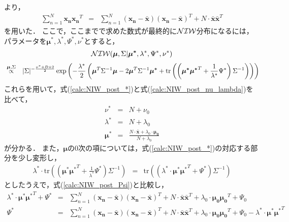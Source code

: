 \documentclass[a4j]{jarticle}
\begin{document}
より，
\begin{eqnarray}
\sum_{n=1}^{N}{\boldsymbol{x_n} \boldsymbol{x_n}^T} &=& \sum_{n=1}^{N}{\left(\boldsymbol{x_n} - \boldsymbol{\bar{x}}\right)\left(\boldsymbol{x_n} - \boldsymbol{\bar{x}}\right)^T} + N \cdot \boldsymbol{\bar{x}} \boldsymbol{\bar{x}}^T
\end{eqnarray}
を用いた．
ここで，ここまでで求めた数式が最終的に$\operatorname{\mathcal{NIW}}$分布になるには，パラメータを$\boldsymbol{\mu^*}, \lambda^*, \Psi^*, \nu^*$とすると，
\begin{eqnarray}
\operatorname{\mathcal{NIW}}(\boldsymbol{\mu}, \Sigma | \boldsymbol{\mu^*}, \lambda^*, \Psi^*, \nu^*) \nonumber
\end{eqnarray}
\begin{eqnarray}
&\overset{\boldsymbol{\mu}, \Sigma}{\propto}&
|\Sigma|^{-\frac{\nu^*+D+2}{2}} \exp{\left( -\frac{\lambda^*}{2} \left( \boldsymbol{\mu}^T \Sigma^{-1}\boldsymbol{\mu} - 2 \boldsymbol{\mu}^T \Sigma^{-1} \boldsymbol{\mu^*} + \textrm{tr}\left(\left( \boldsymbol{\mu^*} \boldsymbol{\mu^*}^T + \frac{1}{\lambda^*} \Psi^* \right) \Sigma^{-1} \right) \right)\right)} \nonumber \\ \label{calc:NIW_post_*}
\end{eqnarray}
これらを用いて，式(\ref{calc:NIW_post_*})と式(\ref{calc:NIW_post_nu_lambda})を比べて，
\begin{eqnarray}
\nu^* &=& N + \nu_0\\
\lambda^* &=& N + \lambda_0\\
\boldsymbol{\mu^*} &=& \frac{N \cdot \boldsymbol{\bar{x}} + \lambda_0  \cdot \boldsymbol{\mu_0}}{N + \lambda_0}
\end{eqnarray}
が分かる．
また，$\boldsymbol{\mu}$の0次の項については，式(\ref{calc:NIW_post_*})の対応する部分を少し変形し，
\begin{eqnarray}
\lambda^* \cdot \textrm{tr}\left(\left(\boldsymbol{\mu^*}\boldsymbol{\mu^*}^T + \frac{1}{\lambda^*} \Psi^*\right)\Sigma^{-1}\right) &=& \textrm{tr}\left(\left(\lambda^* \cdot \boldsymbol{\mu^*}\boldsymbol{\mu^*}^T + \Psi^*\right)\Sigma^{-1}\right)
\end{eqnarray}
としたうえで，式(\ref{calc:NIW_post_Psi})と比較し，
\begin{eqnarray}
\lambda^* \cdot \boldsymbol{\mu^*}\boldsymbol{\mu^*}^T + \Psi^*
&=&
\sum_{n=1}^{N}{(\boldsymbol{x_n} - \boldsymbol{\bar{x}}) (\boldsymbol{x_n} - \boldsymbol{\bar{x}})^T}  + N \cdot \boldsymbol{\bar{x}} \boldsymbol{\bar{x}}^T + \lambda_0 \cdot \boldsymbol{\mu_0} \boldsymbol{\mu_0}^T + \Psi_0 \\
\Psi^*
&=&
\sum_{n=1}^{N}{(\boldsymbol{x_n} - \boldsymbol{\bar{x}}) (\boldsymbol{x_n} - \boldsymbol{\bar{x}})^T}  + N \cdot \boldsymbol{\bar{x}} \boldsymbol{\bar{x}}^T + \lambda_0 \cdot \boldsymbol{\mu_0} \boldsymbol{\mu_0}^T + \Psi_0 - \lambda^* \cdot \boldsymbol{\mu^*}\boldsymbol{\mu^*}^T \nonumber\\
\end{eqnarray}
\end{document}
